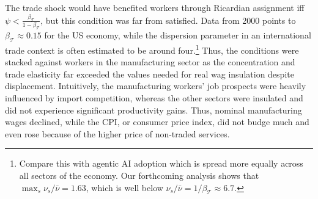 \documentclass[11pt]{article}
\begin{document}
The trade shock would have benefited workers through Ricardian assignment
iff $\psi<\frac{\beta_{\mathscr{T}}}{1-\beta_{\mathscr{T}}}$, but
this condition was far from satisfied. Data from 2000 points to $\beta_{\mathscr{T}}\approx0.15$
for the US economy, while the dispersion parameter in an international
trade context is often estimated to be around four.\footnote{Compare this with agentic AI adoption which is spread more equally
across all sectors of the economy. Our forthcoming analysis shows
that $\max_{s}\nu_{s}/\bar{\nu}=1.63$, which is
well below $\nu_{s}/\bar{\nu}=1/\beta_{\mathscr{T}}\approx6.7$.} Thus, the conditions were stacked against workers in the manufacturing
sector as the concentration and trade elasticity far exceeded the
values needed for real wag insulation despite displacement. Intuitively,
the manufacturing workers' job prospects were heavily influenced by
import competition, whereas the other sectors were insulated and did
not experience significant productivity gains. Thus, nominal manufacturing
wages declined, while the CPI, or consumer price index, did not budge
much and even rose because of the higher price of non-traded services.
\end{document}
